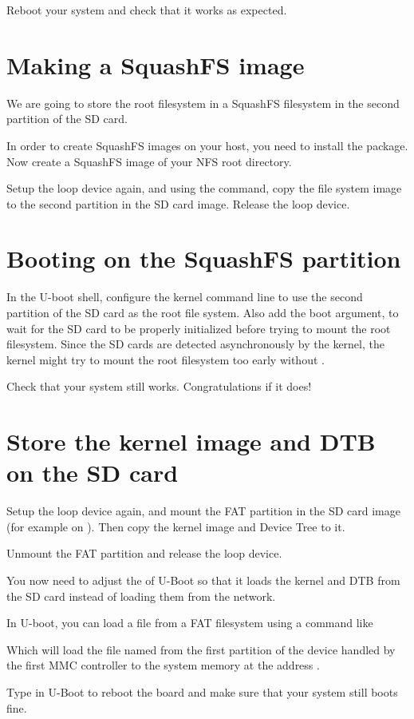 Reboot your system and check that it works as expected.

\section{Making a SquashFS image}

We are going to store the root filesystem in a SquashFS filesystem in
the second partition of the SD card.

In order to create SquashFS images on your host, you need to install
the  package. Now create a SquashFS image of your
NFS root directory.

Setup the loop device again, and using the  command,
copy the file system image to the second partition in the SD card
image. Release the loop device.

\section{Booting on the SquashFS partition}

In the U-boot shell, configure the kernel command line to use the
second partition of the SD card as the root file system. Also add the
 boot argument, to wait for the SD card to be properly
initialized before trying to mount the root filesystem. Since the SD
cards are detected asynchronously by the kernel, the kernel might try
to mount the root filesystem too early without .

Check that your system still works. Congratulations if it does!

\section{Store the kernel image and DTB on the SD card}

Setup the loop device again, and mount the FAT partition
in the SD card image (for example on ).
Then copy the kernel image and Device Tree to it.

Unmount the FAT partition and release the loop device.

You now need to adjust the  of U-Boot so
that it loads the kernel and DTB from the SD card instead of loading
them from the network.

In U-boot, you can load a file from a FAT filesystem using a command
like


Which will load the file named  from the first
partition of the device handled by the first MMC controller to the
system memory at the address .

Type  in U-Boot to reboot the board and make
sure that your system still boots fine.
